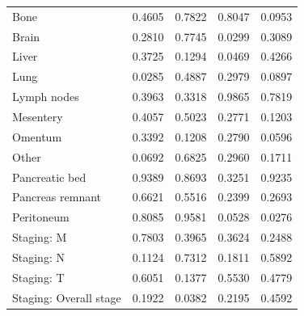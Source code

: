 \documentclass[dissertation.tex]{subfiles}
\begin{document}
\begin{table}[h]
\begin{tabular}{@{}l@{\qquad}ll@{\qquad\quad}ll@{}}
\quad Bone                 & 0.4605                          & 0.7822 & 0.8047                          & 0.0953                          \\
\quad Brain                & 0.2810                          & 0.7745 & 0.0299                          & 0.3089                          \\
\quad Liver                & 0.3725                          & 0.1294 & 0.0469                          & 0.4266                          \\
\quad Lung                 & 0.0285                          & 0.4887 & 0.2979                          & 0.0897                          \\
\quad Lymph nodes          & 0.3963                          & 0.3318 & 0.9865                          & 0.7819                          \\
\quad Mesentery            & 0.4057                          & 0.5023 & 0.2771                          & 0.1203                          \\
\quad Omentum              & 0.3392                          & 0.1208 & 0.2790                          & 0.0596                          \\
\quad Other                & 0.0692                          & 0.6825 & 0.2960                          & 0.1711                          \\
\quad Pancreatic bed       & 0.9389                          & 0.8693 & 0.3251                          & 0.9235                          \\
\quad Pancreas remnant     & 0.6621                          & 0.5516 & 0.2399                          & 0.2693                          \\
\quad Peritoneum           & 0.8085                          & 0.9581 & 0.0528                          & 0.0276                          \\
Staging: M                 & 0.7803                          & 0.3965 & 0.3624                          & 0.2488                          \\
Staging: N                 & 0.1124                          & 0.7312 & 0.1811                          & 0.5892                          \\
Staging: T                 & 0.6051                          & 0.1377 & 0.5530                          & 0.4779                          \\
Staging: Overall stage     & 0.1922                          & 0.0382 & 0.2195                          & 0.4592                          \\

\end{tabular}
\end{table}
\end{document}
